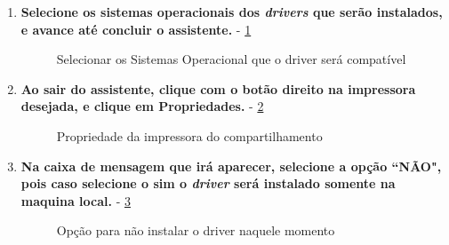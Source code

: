 \begin{enumerate}
	
	\item \textbf{Selecione os sistemas operacionais dos \textit{drivers} que serão instalados, e avance até concluir o assistente.} - \ref{selecionar_so}
	\begin{figure}[ht]
	   	\centering
	   	\caption{Selecionar os Sistemas Operacional que o driver será compatível}
	    \label{selecionar_so}
	\end{figure}
	
	\pagebreak
	
	\item \textbf{Ao sair do assistente, clique com o botão direito na impressora desejada, e clique em Propriedades.} - \ref{propriedade_impressora}
	\begin{figure}[ht]
	   	\centering
	   	\caption{Propriedade da impressora do compartilhamento}
	    \label{propriedade_impressora}
	\end{figure}

	
	\item \textbf{Na caixa de mensagem que irá aparecer, selecione a opção ``NÃO", pois caso selecione o sim o \textit{driver} será instalado somente na maquina local.} - \ref{opcao_nao}
	\begin{figure}[ht]
	   	\centering
	   	\caption{Opção para não instalar o driver naquele momento}
	    \label{opcao_nao}
	\end{figure}
	

\end{enumerate}
